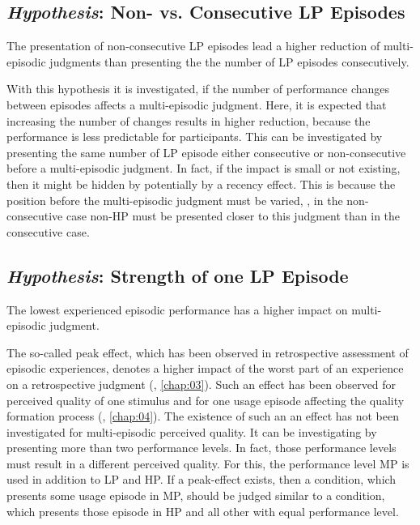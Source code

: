 {\subsection{\emph{Hypothesis}: Non- vs. Consecutive \acs{LP} Episodes}
\begin{hypothesis}\label{hypo:consecutive}
The presentation of non-consecutive \ac{LP} episodes lead a higher reduction of multi-episodic judgments than presenting the the number of \ac{LP} episodes consecutively.
\end{hypothesis}

With this hypothesis it is investigated, if the number of performance changes between episodes affects a multi-episodic judgment.
Here, it is expected that increasing the number of changes results in higher reduction, because the performance is less predictable for participants.
This can be investigated by presenting the same number of \ac{LP} episode either consecutive or non-consecutive before a multi-episodic judgment.
In fact, if the impact is small or not existing, then it might be hidden by potentially by a recency effect.
This is because the position before the multi-episodic judgment must be varied, \ie, in the non-consecutive case non-\ac{HP} must be presented closer to this judgment than in the consecutive case.

\subsection{\emph{Hypothesis}: Strength of one \acs{LP} Episode}
\begin{hypothesis}\label{hypo:strength}
The lowest experienced episodic performance has a higher impact on multi-episodic judgment.
\end{hypothesis}

The so-called peak effect, which has been observed in retrospective assessment of episodic experiences, denotes a higher impact of the worst part of an experience on a retrospective judgment (\cf, \autoref{chap:03}).
Such an effect has been observed for perceived quality of one stimulus and for one usage episode affecting the quality formation process (\cf, \autoref{chap:04}).
The existence of such an an effect has not been investigated for multi-episodic perceived quality.
It can be investigating by presenting more than two performance levels.
In fact, those performance levels must result in a different perceived quality.
For this, the performance level \ac{MP} is used in addition to \ac{LP} and \ac{HP}.
If a peak-effect exists, then a condition, which presents some usage episode in \ac{MP}, should be judged similar to a condition, which presents those episode in \ac{HP} and all other with equal performance level.

}

